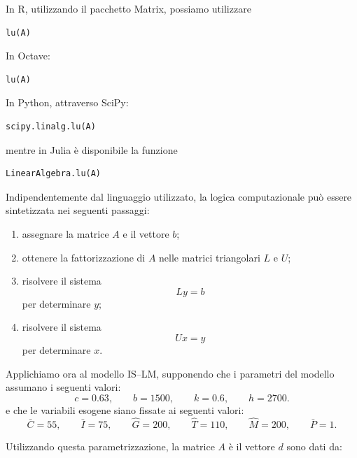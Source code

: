 In \textsf{R}, utilizzando il pacchetto \textsf{Matrix}, possiamo
utilizzare

\begin{verbatim}
lu(A)
\end{verbatim}

In \textsf{Octave}:

\begin{verbatim}
lu(A)
\end{verbatim}

In \textsf{Python}, attraverso \textsf{SciPy}:

\begin{verbatim}
scipy.linalg.lu(A)
\end{verbatim}

mentre in \textsf{Julia} è disponibile la funzione

\begin{verbatim}
LinearAlgebra.lu(A)
\end{verbatim}

Indipendentemente dal linguaggio utilizzato, la logica
computazionale può essere sintetizzata nei seguenti passaggi:

\begin{enumerate}
    \item assegnare la matrice $A$ e il vettore $b$;
    \item ottenere la fattorizzazione di $A$ nelle matrici
          triangolari $L$ e $U$;
    \item risolvere il sistema
          \begin{equation*}
              Ly=b
          \end{equation*}
          per determinare $y$;
    \item risolvere il sistema
          \begin{equation*}
              Ux=y
          \end{equation*}
          per determinare $x$.
\end{enumerate}

Applichiamo ora al modello IS--LM, supponendo che i parametri del modello assumano i seguenti valori:
\[
c=0.63, \qquad
b=1500, \qquad
k=0.6, \qquad
h=2700.
\]
e che le variabili esogene siano fissate ai seguenti valori:
\[
\bar{C}=55, \qquad
\bar{I}=75, \qquad
\hat{G}=200, \qquad
\hat{T}=110, \qquad
\hat{M}=200, \qquad
\bar{P}=1.
\]

Utilizzando questa parametrizzazione, la matrice $A$ è il vettore $d$ sono dati da:

